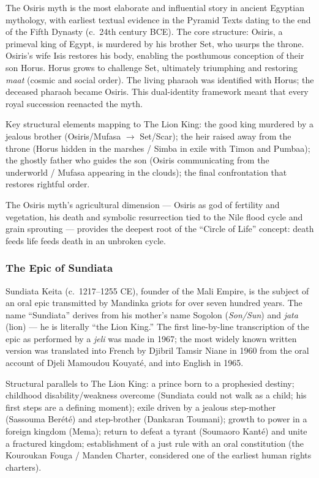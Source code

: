 \documentclass[11pt,letterpaper]{article}
\begin{document}
The Osiris myth is the most elaborate and influential story in ancient Egyptian mythology, with earliest textual evidence in the Pyramid Texts dating to the end of the Fifth Dynasty (c.~24th century BCE). The core structure: Osiris, a primeval king of Egypt, is murdered by his brother Set, who usurps the throne. Osiris's wife Isis restores his body, enabling the posthumous conception of their son Horus. Horus grows to challenge Set, ultimately triumphing and restoring \textit{maat} (cosmic and social order). The living pharaoh was identified with Horus; the deceased pharaoh became Osiris. This dual-identity framework meant that every royal succession reenacted the myth.

Key structural elements mapping to The Lion King: the good king murdered by a jealous brother (Osiris/Mufasa $\rightarrow$ Set/Scar); the heir raised away from the throne (Horus hidden in the marshes / Simba in exile with Timon and Pumbaa); the ghostly father who guides the son (Osiris communicating from the underworld / Mufasa appearing in the clouds); the final confrontation that restores rightful order.

The Osiris myth's agricultural dimension --- Osiris as god of fertility and vegetation, his death and symbolic resurrection tied to the Nile flood cycle and grain sprouting --- provides the deepest root of the ``Circle of Life'' concept: death feeds life feeds death in an unbroken cycle.

\subsubsection{The Epic of Sundiata}

Sundiata Keita (c.~1217--1255 CE), founder of the Mali Empire, is the subject of an oral epic transmitted by Mandinka griots for over seven hundred years. The name ``Sundiata'' derives from his mother's name Sogolon (\textit{Son/Sun}) and \textit{jata} (lion) --- he is literally ``the Lion King.'' The first line-by-line transcription of the epic as performed by a \textit{jeli} was made in 1967; the most widely known written version was translated into French by Djibril Tamsir Niane in 1960 from the oral account of Djeli Mamoudou Kouyat\'{e}, and into English in 1965.

Structural parallels to The Lion King: a prince born to a prophesied destiny; childhood disability/weakness overcome (Sundiata could not walk as a child; his first steps are a defining moment); exile driven by a jealous step-mother (Sassouma Ber\'{e}t\'{e}) and step-brother (Dankaran Toumani); growth to power in a foreign kingdom (Mema); return to defeat a tyrant (Soumaoro Kant\'{e}) and unite a fractured kingdom; establishment of a just rule with an oral constitution (the Kouroukan Fouga / Manden Charter, considered one of the earliest human rights charters).
\end{document}
